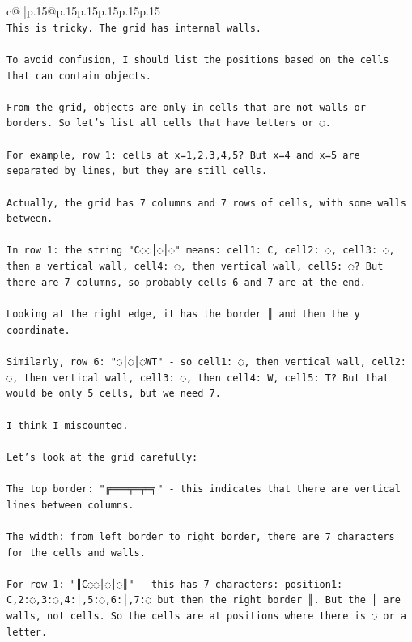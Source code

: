 \documentclass{article}
\begin{document}
{\begin{supertabular}{c@{$\;$}|p{.15\linewidth}@{}p{.15\linewidth}p{.15\linewidth}p{.15\linewidth}p{.15\linewidth}p{.15\linewidth}}
{{{\\ 
\texttt{This is tricky. The grid has internal walls.} \\
\\ 
\texttt{To avoid confusion, I should list the positions based on the cells that can contain objects.} \\
\\ 
\texttt{From the grid, objects are only in cells that are not walls or borders. So let's list all cells that have letters or ◌.} \\
\\ 
\texttt{For example, row 1: cells at x=1,2,3,4,5? But x=4 and x=5 are separated by lines, but they are still cells.} \\
\\ 
\texttt{Actually, the grid has 7 columns and 7 rows of cells, with some walls between.} \\
\\ 
\texttt{In row 1: the string "C◌◌│◌│◌" means: cell1: C, cell2: ◌, cell3: ◌, then a vertical wall, cell4: ◌, then vertical wall, cell5: ◌? But there are 7 columns, so probably cells 6 and 7 are at the end.} \\
\\ 
\texttt{Looking at the right edge, it has the border ║ and then the y coordinate.} \\
\\ 
\texttt{Similarly, row 6: "◌│◌│◌WT" {-} so cell1: ◌, then vertical wall, cell2: ◌, then vertical wall, cell3: ◌, then cell4: W, cell5: T? But that would be only 5 cells, but we need 7.} \\
\\ 
\texttt{I think I miscounted.} \\
\\ 
\texttt{Let's look at the grid carefully:} \\
\\ 
\texttt{The top border: "╔═══╤═╤═╗" {-} this indicates that there are vertical lines between columns.} \\
\\ 
\texttt{The width: from left border to right border, there are 7 characters for the cells and walls.} \\
\\ 
\texttt{For row 1: "║C◌◌│◌│◌║" {-} this has 7 characters: position1: C,2:◌,3:◌,4:│,5:◌,6:│,7:◌ but then the right border ║. But the │ are walls, not cells. So the cells are at positions where there is ◌ or a letter.} \\
\\ 
}}}
\end{supertabular}}
\end{document}
